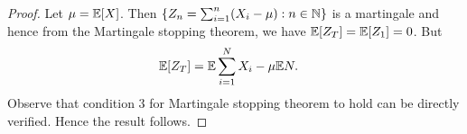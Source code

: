 \documentclass[a4paper,10pt,english]{article}
\begin{document}
\begin{proof}
Let $\mu=\mathbb{E}[X]$. Then $\{Z_n = \sum_{i=1}^{n}(X_i-\mu): n \in \mathbb{N}\}$ is a martingale and hence from the Martingale stopping theorem, we have $\mathbb{E}[Z_T]=\mathbb{E}[Z_1]=0$. But 
\begin{align*}
\E[Z_T] %
&=\E\sum_{i=1}^N X_i- \mu\E N.
\end{align*}
Observe that condition $3$  for Martingale stopping theorem to hold can be directly verified. Hence the result follows. 
\end{proof}
\end{document}
